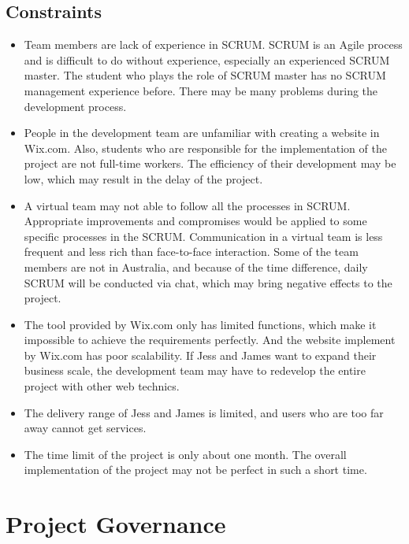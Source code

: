 \documentclass{report}
\begin{document}
\section{Constraints}
\begin{itemize}
  \item Team members are lack of experience in SCRUM. SCRUM is an Agile process and is difficult to do without experience, especially an experienced SCRUM master. The student who plays the role of SCRUM master has no SCRUM management experience before. There may be many problems during the development process.
  \item People in the development team are unfamiliar with creating a website in Wix.com. Also, students who are responsible for the implementation of the project are not full-time workers. The efficiency of their development may be low, which may result in the delay of the project.
  \item A virtual team may not able to follow all the processes in SCRUM. Appropriate improvements and compromises would be applied to some specific processes in the SCRUM. Communication in a virtual team is less frequent and less rich than face-to-face interaction. Some of the team members are not in Australia, and because of the time difference, daily SCRUM will be conducted via chat, which may bring negative effects to the project.
  \item The tool provided by Wix.com only has limited functions, which make it impossible to achieve the requirements perfectly. And the website implement by Wix.com has poor scalability. If Jess and James want to expand their business scale, the development team may have to redevelop the entire project with other web technics.
  \item The delivery range of Jess and James is limited, and users who are too far away cannot get services.
  \item The time limit of the project is only about one month. The overall implementation of the project may not be perfect in such a short time.
\end{itemize}

\chapter{Project Governance}
\end{document}
